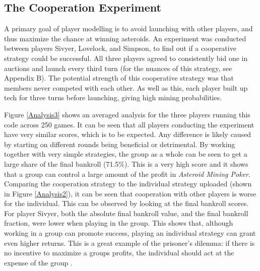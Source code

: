 \documentclass[11pt, twoside]{article}
\begin{document}
\subsection{The Cooperation Experiment}
A primary goal of player modelling is to avoid launching with other players, and thus maximize the chance at winning asteroids. An experiment was conducted between players Sivyer, Lovelock, and Simpson, to find out if a cooperative strategy could be successful. All three players agreed to consistently bid one in auctions and launch every third turn (for the nuances of this strategy, see Appendix B). The potential strength of this cooperative strategy was that members never competed with each other. As well as this, each player built up tech for three turns before launching, giving high mining probabilities.

Figure \ref{Analysis3} shows an averaged analysis for the three players running this code across 250 games. It can be seen that all players conducting the experiment have very similar scores, which is to be expected. Any difference is likely caused by starting on different rounds being beneficial or detrimental. By working together with very simple strategies, the group as a whole can be seen to get a large share of the final bankroll (71.5\%). This is a very high score and it shows that a group can control a large amount of the profit in \textit{Asteroid Mining Poker}. Comparing the cooperation strategy to the individual strategy uploaded (shown in Figure \ref{Analysis2}), it can be seen that cooperation with other players is worse for the individual. This can be observed by looking at the final bankroll scores. For player Sivyer, both the absolute final bankroll value, and the final bankroll fraction, were lower when playing in the group. This shows that, although working in a group can promote success, playing an individual strategy can grant even higher returns. This is a great example of the prisoner's dilemma: if there is no incentive to maximize a groups profits, the individual should act at the expense of the group \cite{axelrod1980effective}.
\end{document}
